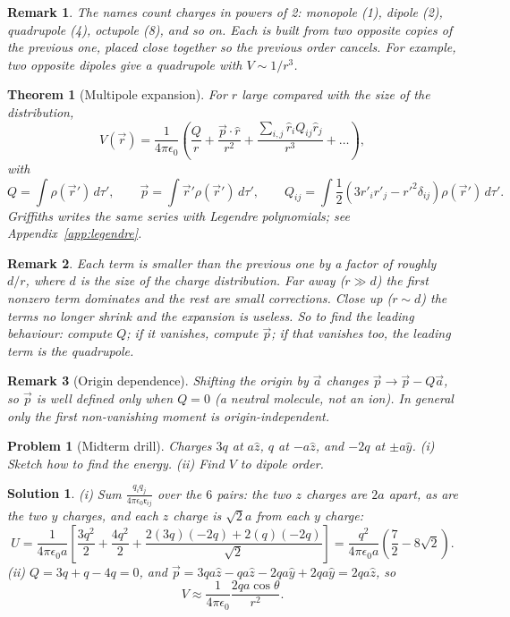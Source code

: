 \documentclass{article}
\newtheorem{theorem}{Theorem}
\newtheorem{problem}{Problem}
\newtheorem{solution}{Solution}
\newtheorem{remark}{Remark}
\begin{document}
\begin{remark}
    The names count charges in powers of 2: monopole (1), dipole (2), quadrupole (4), octupole (8), and so on. Each is built from two opposite copies of the previous one, placed close together so the previous order cancels. For example, two opposite dipoles give a quadrupole with $V \sim 1/r^3$.
\end{remark}
\begin{theorem}[Multipole expansion]
    For $r$ large compared with the size of the distribution,
    \begin{equation}
        V(\vec{r}) = \frac{1}{4\pi\epsilon_0}\left(\frac{Q}{r} + \frac{\vec{p}\cdot\hat{r}}{r^2} + \frac{\sum_{i,j}\hat{r}_iQ_{ij}\hat{r}_j}{r^3} + \dots\right),
    \end{equation}
    with
    \[Q = \int\rho(\vec{r}')\,d\tau', \qquad
    \vec{p} = \int\vec{r}'\rho(\vec{r}')\,d\tau', \qquad
    Q_{ij} = \int\frac{1}{2}\left(3r'_ir'_j - r'^2\delta_{ij}\right)\rho(\vec{r}')\,d\tau'.\]
    Griffiths writes the same series with Legendre polynomials; see Appendix~\ref{app:legendre}.
\end{theorem}
\begin{remark}
    Each term is smaller than the previous one by a factor of roughly $d/r$, where $d$ is the size of the charge distribution. Far away ($r \gg d$) the first nonzero term dominates and the rest are small corrections. Close up ($r \sim d$) the terms no longer shrink and the expansion is useless. So to find the leading behaviour: compute $Q$; if it vanishes, compute $\vec{p}$; if that vanishes too, the leading term is the quadrupole.
\end{remark}
\begin{remark}[Origin dependence]
    Shifting the origin by $\vec{a}$ changes $\vec{p} \to \vec{p} - Q\vec{a}$, so $\vec{p}$ is well defined only when $Q = 0$ (a neutral molecule, not an ion). In general only the first non-vanishing moment is origin-independent.
\end{remark}
\begin{problem}[Midterm drill]
    Charges $3q$ at $a\hat{z}$, $q$ at $-a\hat{z}$, and $-2q$ at $\pm a\hat{y}$. (i) Sketch how to find the energy. (ii) Find $V$ to dipole order.
\end{problem}
\begin{solution}
    (i) Sum $\frac{q_iq_j}{4\pi\epsilon_0\mathfrak{r}_{ij}}$ over the $6$ pairs: the two $z$ charges are $2a$ apart, as are the two $y$ charges, and each $z$ charge is $\sqrt{2}a$ from each $y$ charge:
    \[U = \frac{1}{4\pi\epsilon_0 a}\left[\frac{3q^2}{2} + \frac{4q^2}{2} + \frac{2(3q)(-2q) + 2(q)(-2q)}{\sqrt{2}}\right] = \frac{q^2}{4\pi\epsilon_0 a}\left(\frac{7}{2} - 8\sqrt{2}\right).\]
    (ii) $Q = 3q + q - 4q = 0$, and $\vec{p} = 3qa\hat{z} - qa\hat{z} - 2qa\hat{y} + 2qa\hat{y} = 2qa\hat{z}$, so
    \[V \approx \frac{1}{4\pi\epsilon_0}\frac{2qa\cos\theta}{r^2}.\]
\end{solution}
\end{document}
